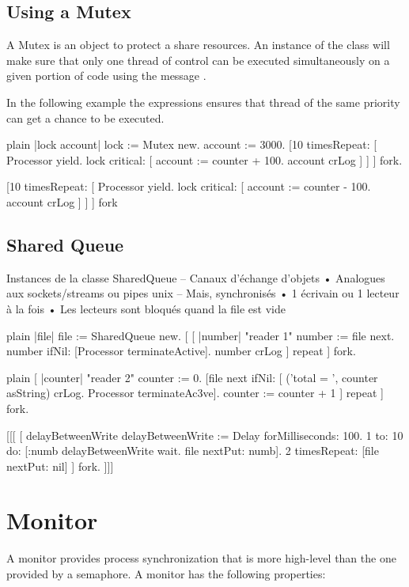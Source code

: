 \documentclass[10pt,twoside,english]{_support/latex/sbabook/sbabook}
\begin{document}
\section{Using a Mutex}
A Mutex is an object to protect a share resources. An instance of the class  will make sure that only one thread of control can be executed simultaneously on a given portion of code using the message .

In the following example the expressions  ensures that thread of the same priority can get a chance to be executed. 

\begin{displaycode}{plain}
|lock account|
lock := Mutex new.
account := 3000.
[10 timesRepeat: [ Processor yield.
	lock critical: [ account := counter + 100.
					account crLog ] ]
	] fork.

[10 timesRepeat: [ Processor yield.
	lock critical: [ account := counter - 100.
					account crLog ] ]
	] fork
\end{displaycode}
\section{Shared Queue}
Instances de la classe SharedQueue  –  Canaux d'échange d'objets 
•  Analogues aux sockets/streams ou pipes unix  –  Mais, synchronisés 
•  1 écrivain ou 1 lecteur à la fois 
•  Les lecteurs sont bloqués quand la file est vide

\begin{displaycode}{plain}
|file| 
file := SharedQueue new.
[
	[ |number| "reader 1"
	number := file next.
	number ifNil: [Processor terminateActive].
	number crLog ] repeat
	] fork. 
\end{displaycode}

\begin{displaycode}{plain}
	[ |counter| "reader 2" 
	counter := 0. 
	[file next ifNil: [ ('total = ', counter asString) crLog.
		Processor terminateAc3ve].
		counter := counter + 1 ] repeat 
	] fork.
\end{displaycode}

 {[}{[}{[}
{[}	
	\textbar{}delayBetweenWrite\textbar{}
	delayBetweenWrite := Delay forMilliseconds: 100.   
	1 to: 10 do: {[}:numb\textbar{} 
		delayBetweenWrite wait.
		file nextPut: numb{]}.
	2 timesRepeat: {[}file nextPut: nil{]}
	{]} fork. 
{]}{]}{]}
\chapter{Monitor}
A monitor provides process synchronization that is more high-level than the one provided by a semaphore. A monitor has the following properties:
\end{document}
